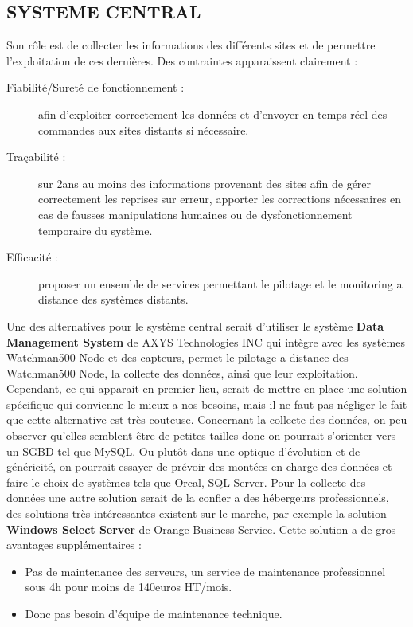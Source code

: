 \documentclass{article}
\begin{document}
\subsection{SYSTEME CENTRAL}
		Son rôle est de collecter les informations des différents sites et de permettre l'exploitation de ces dernières.
		Des contraintes apparaissent clairement : 
		\begin{description}
				\item[Fiabilité/Sureté de fonctionnement :] afin d'exploiter correctement les données et d'envoyer en temps réel des commandes aux sites distants si nécessaire.
				\item[Traçabilité :] sur 2ans au moins des informations provenant des sites afin de gérer correctement les reprises sur erreur, apporter les corrections nécessaires en cas de fausses manipulations humaines ou de dysfonctionnement temporaire du système.
				\item[Efficacité :] proposer un ensemble de services permettant le pilotage et le monitoring a distance des systèmes distants.
		\end{description}

		Une des alternatives pour le système central serait d'utiliser le système \textbf{Data Management System} de AXYS Technologies INC qui intègre avec les systèmes Watchman500 Node et des capteurs, permet le pilotage a distance des Watchman500 Node, la collecte des données, ainsi que leur exploitation.
		Cependant, ce qui apparait en premier lieu, serait de mettre en place une solution spécifique qui convienne le mieux a nos besoins, mais il ne faut pas négliger le fait que cette alternative est très couteuse.
		Concernant la collecte des données, on peu observer qu'elles semblent être de petites tailles donc on pourrait s'orienter vers un SGBD tel que MySQL. Ou plutôt dans une optique d'évolution et de généricité, on pourrait essayer de prévoir des montées en charge des données et faire le choix de systèmes tels que Orcal, SQL Server.
		Pour la collecte des données une autre solution serait de la confier a des hébergeurs professionnels, des solutions très intéressantes existent sur le marche, par exemple la solution \textbf{Windows Select Server} de Orange Business Service. Cette solution a de gros avantages supplémentaires :
		\begin{itemize}
				\item Pas de maintenance des serveurs, un service de maintenance professionnel sous 4h pour moins de 140euros HT/mois.
				\item Donc pas besoin d'équipe de maintenance technique.
		\end{itemize}
\end{document}
